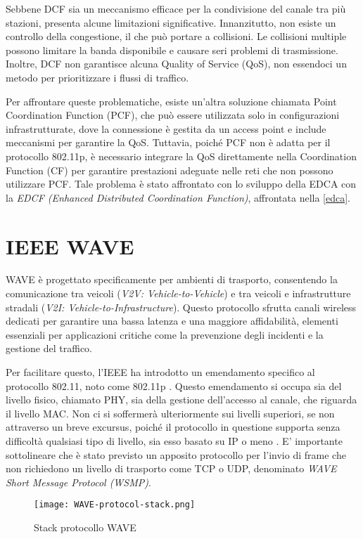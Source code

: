 Sebbene DCF sia un meccanismo efficace per la condivisione del canale tra più stazioni, presenta alcune limitazioni significative. Innanzitutto, non esiste un controllo della congestione, il che può portare a collisioni. Le collisioni multiple possono limitare la banda disponibile e causare seri problemi di trasmissione. Inoltre, DCF non garantisce alcuna Quality of Service (QoS), non essendoci un metodo per prioritizzare i flussi di traffico.

Per affrontare queste problematiche, esiste un'altra soluzione chiamata Point Coordination Function (PCF), che può essere utilizzata solo in configurazioni infrastrutturate, dove la connessione è gestita da un access point e include meccanismi per garantire la QoS. Tuttavia, poiché PCF non è adatta per il protocollo 802.11p, è necessario integrare la QoS direttamente nella Coordination Function (CF) per garantire prestazioni adeguate nelle reti che non possono utilizzare PCF. Tale problema è stato affrontato con lo sviluppo della EDCA con la \textit{EDCF (Enhanced Distributed Coordination Function)}, affrontata nella \autoref{edca}.

\section{IEEE WAVE}
WAVE è progettato specificamente per ambienti di trasporto, consentendo la comunicazione tra veicoli (\textit{V2V: Vehicle-to-Vehicle}) e tra veicoli e infrastrutture stradali (\textit{V2I: Vehicle-to-Infrastructure}). Questo protocollo sfrutta canali wireless dedicati per garantire una bassa latenza e una maggiore affidabilità, elementi essenziali per applicazioni critiche come la prevenzione degli incidenti e la gestione del traffico. 

Per facilitare questo, l'IEEE ha introdotto un emendamento specifico al protocollo 802.11, noto come 802.11p \cite{std2007wireless}. Questo emendamento si occupa sia del livello fisico, chiamato PHY, sia della gestione dell'accesso al canale, che riguarda il livello MAC. Non ci si soffermerà ulteriormente sui livelli superiori, se non attraverso un breve excursus, poiché il protocollo in questione supporta senza difficoltà qualsiasi tipo di livello, sia esso basato su IP o meno \cite{DSRC-Based-vehicular}. E' importante sottolineare che è stato previsto un apposito protocollo per l'invio di frame che non richiedono un livello di trasporto come TCP o UDP, denominato \textit{WAVE Short Message Protocol (WSMP)}.

\begin{figure}[h!]
    \centering
    \texttt{[image: WAVE-protocol-stack.png]}
    \caption{Stack protocollo WAVE}
    \label{fig:wave_stack}
\end{figure}

